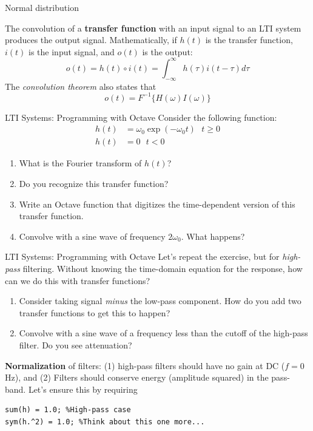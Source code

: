 \documentclass{beamer}
\begin{document}
\begin{frame}{Normal distribution}
\begin{tcolorbox}[colback=white,colframe=red!40!blue,title=Transfer Function]
\alert{The convolution of a \textbf{transfer function} with an input signal to an LTI system produces the output signal.  Mathematically, if $h(t)$ is the transfer function, $i(t)$ is the input signal, and $o(t)$ is the output:
\begin{equation}
o(t) = h(t) \circ i(t) = \int_{-\infty}^{\infty} h(\tau) i(t-\tau) d\tau
\end{equation}
The \textit{convolution theorem} also states that
\begin{equation}
o(t) = F^{-1} \lbrace H(\omega) I(\omega) \rbrace
\end{equation}
}
\end{tcolorbox}
\end{frame}

\begin{frame}[fragile]{LTI Systems: Programming with Octave}
\small
Consider the following function:
\begin{align}
h(t) &= \omega_0 \exp(-\omega_0 t) ~~~ t\geq 0 \\
h(t) &= 0 ~~~ t<0
\end{align}
\begin{enumerate}
\item What is the Fourier transform of $h(t)$?
\item Do you recognize this transfer function?
\item Write an Octave function that digitizes the time-dependent version of this transfer function.
\item Convolve with a sine wave of frequency $2\omega_0$.  What happens?
\end{enumerate}
\end{frame}

\begin{frame}[fragile]{LTI Systems: Programming with Octave}
\small
Let's repeat the exercise, but for \textit{high-pass} filtering.  Without knowing the time-domain equation for the response, how can we do this with transfer functions?
\begin{enumerate}
\item Consider taking signal \textit{minus} the low-pass component.  How do you add two transfer functions to get this to happen?
\item Convolve with a sine wave of a frequency less than the cutoff of the high-pass filter.  Do you see attenuation?
\end{enumerate}
\textbf{Normalization} of filters: (1) high-pass filters should have no gain at DC ($f=0$ Hz), and (2) Filters should conserve energy (amplitude squared) in the pass-band.  Let's ensure this by requiring
\begin{verbatim}
sum(h) = 1.0; %High-pass case
sym(h.^2) = 1.0; %Think about this one more...
\end{verbatim}
\end{frame}
\end{document}
